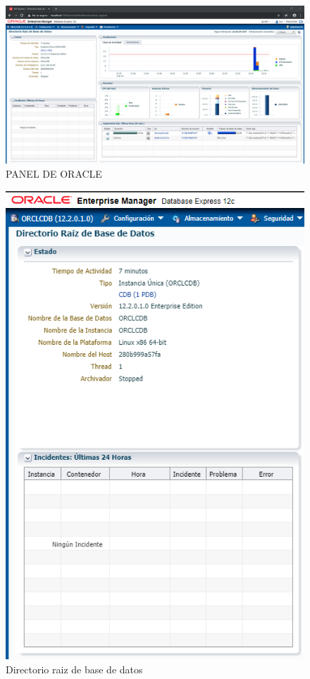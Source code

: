\documentclass[preprint,12pt]{elsarticle}
\begin{document}
\begin{figure}[H]
	\begin{center}
		\includegraphics[width=12cm]{./IMAGENES/IMAGEN9} 
		\caption{PANEL DE ORACLE}
	\end{center}
\end{figure}

\begin{figure}[H]
	\begin{center}
		\includegraphics[width=12cm]{./IMAGENES/IMAGEN10} 
		\caption{Directorio raiz de base de datos}
	\end{center}
\end{figure}
\end{document}

